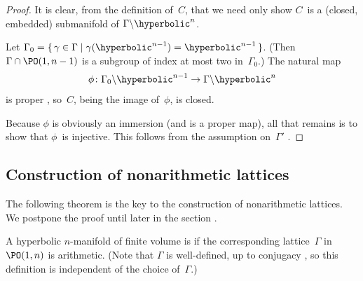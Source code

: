 \begin{proof}
 It is clear, from the definition of~$C$, that we need only
show $C$~is a (closed, embedded) submanifold of $\Gamma
\backslash \hyperbolic^n$.

Let $\Gamma_0 = \{\, \gamma \in \Gamma \mid
\gamma(\hyperbolic^{n-1}) = \hyperbolic^{n-1} \,\}$. (Then
$\Gamma \cap \PO(1,n-1)$ is a subgroup of index at most two
in~$\Gamma_0$.) 
 The natural map
 $$ \phi \colon \Gamma_0 \backslash \hyperbolic^{n-1} \to
\Gamma \backslash \hyperbolic^n$$
 is proper , so~$C$, being the
image of~$\phi$, is closed.

Because $\phi$ is obviously an immersion (and is a proper
map), all that remains is to show that $\phi$~is injective.
This follows from the assumption on~$\Gamma'$
.
 \end{proof}



\subsection{Construction of nonarithmetic lattices}

The following theorem is the key to the construction of
nonarithmetic lattices. We postpone the proof until later
in the section .

\begin{defn} \label{ArithHypMfldDefn}
 A hyperbolic $n$-manifold of finite volume is
 if the
corresponding lattice~$\Gamma$ in $\PO(1,n)$
 is arithmetic. (Note that $\Gamma$
is well-defined, up to conjugacy
, so this definition is
independent of the choice of~$\Gamma$.)
 \end{defn}


